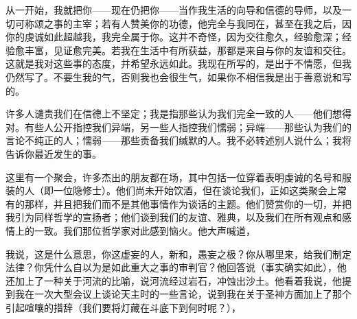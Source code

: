 \par

从一开始，我就把你——现在仍把你——当作我生活的向导和信德的导师，以及一切可称颂之事的主宰；若有人赞美你的功德，他完全与我同在，甚至在我之后，因你的虔诚如此超越我，我完全属于你。这并不奇怪，因为交往愈久，经验愈深；经验愈丰富，见证愈完美。若我在生活中有所获益，那都是来自与你的友谊和交往。这就是我对这些事的态度，并希望永远如此。我现在所写的，是出于不情愿，但我仍然写了。不要生我的气，否则我也会很生气，如果你不相信我是出于善意说和写的。\par

许多人谴责我们在信德上不坚定；我是指那些认为我们完全一致的人——他们想得对。有些人公开指控我们异端，另一些人指控我们懦弱；异端——那些认为我们的言论不纯正的人；懦弱——那些责备我们缄默的人。我不必转述别人说什么；我将告诉你最近发生的事。\par

这里有一个聚会，许多杰出的朋友都在场，其中包括一位穿着表明虔诚的名号和服装的人（即一位隐修士）。他们尚未开始饮酒，但在谈论我们，正如这类聚会上常有的那样，并且把我们而不是其他事情作为谈话的主题。他们赞赏你的一切，并把我引为同样哲学的宣扬者；他们谈到我们的友谊、雅典，以及我们在所有观点和感情上的一致。我们那位哲学家对此感到恼火。他大声喊道，\par

我说，这是什么意思，你这虚妄的人，新和，愚妄之极？你从哪里来，给我们制定法律？你凭什么自以为是如此重大之事的审判官？他回答说（事实确实如此），他还加上了一种关于河流的比喻，说河流经过岩石，冲蚀出沙土。他看着我说，他提到我在一次大型会议上谈论天主时的一些言论，说到我在关于圣神方面加上了那个引起喧嚷的措辞（我们要将灯藏在斗底下到何时呢？），\par

